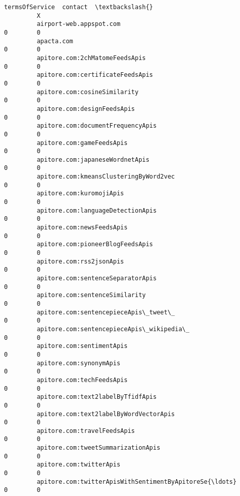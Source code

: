 \documentclass[11pt]{article}
\begin{document}
\begin{Verbatim}[commandchars=\\\{\}]
                                                             termsOfService  contact  \textbackslash{}
         X                                                                             
         airport-web.appspot.com                                          0        0   
         apacta.com                                                       0        0   
         apitore.com:2chMatomeFeedsApis                                   0        0   
         apitore.com:certificateFeedsApis                                 0        0   
         apitore.com:cosineSimilarity                                     0        0   
         apitore.com:designFeedsApis                                      0        0   
         apitore.com:documentFrequencyApis                                0        0   
         apitore.com:gameFeedsApis                                        0        0   
         apitore.com:japaneseWordnetApis                                  0        0   
         apitore.com:kmeansClusteringByWord2vec                           0        0   
         apitore.com:kuromojiApis                                         0        0   
         apitore.com:languageDetectionApis                                0        0   
         apitore.com:newsFeedsApis                                        0        0   
         apitore.com:pioneerBlogFeedsApis                                 0        0   
         apitore.com:rss2jsonApis                                         0        0   
         apitore.com:sentenceSeparatorApis                                0        0   
         apitore.com:sentenceSimilarity                                   0        0   
         apitore.com:sentencepieceApis\_tweet\_                             0        0   
         apitore.com:sentencepieceApis\_wikipedia\_                         0        0   
         apitore.com:sentimentApis                                        0        0   
         apitore.com:synonymApis                                          0        0   
         apitore.com:techFeedsApis                                        0        0   
         apitore.com:text2labelByTfidfApis                                0        0   
         apitore.com:text2labelByWordVectorApis                           0        0   
         apitore.com:travelFeedsApis                                      0        0   
         apitore.com:tweetSummarizationApis                               0        0   
         apitore.com:twitterApis                                          0        0   
         apitore.com:twitterApisWithSentimentByApitoreSe{\ldots}               0        0   

\end{Verbatim}
\end{document}
